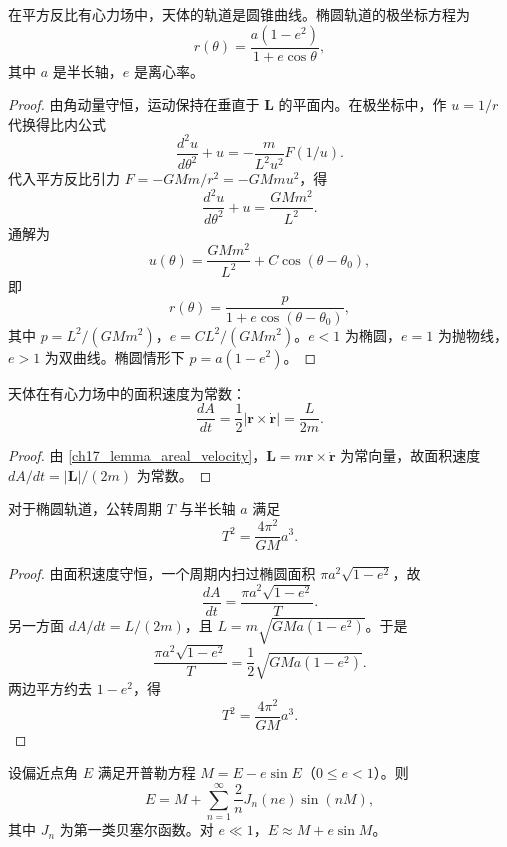 \begin{theorem}\label{thm:kepler_first}
在平方反比有心力场中，天体的轨道是圆锥曲线。椭圆轨道的极坐标方程为
\[
r(\theta)=\frac{a(1-e^2)}{1+e\cos\theta},
\]
其中 \(a\) 是半长轴，\(e\) 是离心率。
\end{theorem}

\begin{proof}
由角动量守恒，运动保持在垂直于 \(\mathbf L\) 的平面内。在极坐标中，作 \(u=1/r\) 代换得比内公式
\[
\frac{d^2u}{d\theta^2}+u=-\frac{m}{L^2u^2}F(1/u).
\]
代入平方反比引力 \(F=-GMm/r^2=-GMm u^2\)，得
\[
\frac{d^2u}{d\theta^2}+u=\frac{GMm^2}{L^2}.
\]
通解为
\[
u(\theta)=\frac{GMm^2}{L^2}+C\cos(\theta-\theta_0),
\]
即
\[
r(\theta)=\frac{p}{1+e\cos(\theta-\theta_0)},
\]
其中 \(p=L^2/(GMm^2)\)，\(e=CL^2/(GMm^2)\)。\(e<1\) 为椭圆，\(e=1\) 为抛物线，\(e>1\) 为双曲线。椭圆情形下 \(p=a(1-e^2)\)。
\end{proof}

\begin{theorem}\label{thm:kepler_second}
天体在有心力场中的面积速度为常数：
\[
\frac{dA}{dt}=\frac12|\mathbf r\times\dot{\mathbf r}|=\frac{L}{2m}.
\]
\end{theorem}

\begin{proof}
由 \cref{ch17_lemma_areal_velocity}，\(\mathbf L=m\mathbf r\times\dot{\mathbf r}\) 为常向量，故面积速度 \(dA/dt=|\mathbf L|/(2m)\) 为常数。
\end{proof}

\begin{theorem}\label{thm:kepler_third}
对于椭圆轨道，公转周期 \(T\) 与半长轴 \(a\) 满足
\[
T^2=\frac{4\pi^2}{GM}a^3.
\]
\end{theorem}

\begin{proof}
由面积速度守恒，一个周期内扫过椭圆面积 \(\pi a^2\sqrt{1-e^2}\)，故
\[
\frac{dA}{dt}=\frac{\pi a^2\sqrt{1-e^2}}{T}.
\]
另一方面 \(dA/dt=L/(2m)\)，且 \(L=m\sqrt{GMa(1-e^2)}\)。于是
\[
\frac{\pi a^2\sqrt{1-e^2}}{T}=\frac12\sqrt{GMa(1-e^2)}.
\]
两边平方约去 \(1-e^2\)，得
\[
T^2=\frac{4\pi^2}{GM}a^3.
\]
\end{proof}

\begin{lemma}[开普勒方程的拉格朗日反演解]\label{lem:kepler_equation_solution}
设偏近点角 \(E\) 满足开普勒方程 \(M=E-e\sin E\)（\(0\le e<1\)）。则
\[
E=M+\sum_{n=1}^{\infty}\frac2nJ_n(ne)\sin(nM),
\]
其中 \(J_n\) 为第一类贝塞尔函数。对 \(e\ll1\)，\(E\approx M+e\sin M\)。
\end{lemma}

